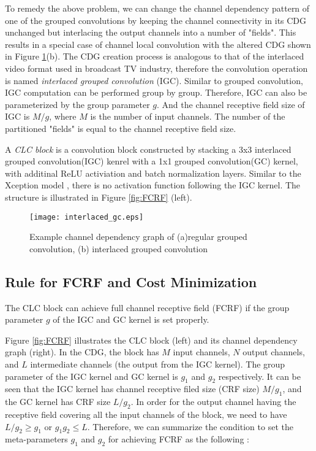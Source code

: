 \documentclass[10pt,twocolumn,letterpaper]{article}
\begin{document}
To remedy the above problem, we can change the channel dependency pattern of one of the grouped convolutions by keeping the channel connectivity in its CDG unchanged but interlacing the output channels into a number of "fields". This results in a special case of channel local convolution with the altered CDG shown in Figure \ref{fig:igc}(b). The CDG creation process is analogous to that of the interlaced video format used in broadcast TV industry, therefore the convolution operation is named \textit{interlaced grouped convolution} (IGC). Similar to grouped convolution, IGC computation can be performed group by group. Therefore, IGC can also be parameterized by the group parameter $g$. And the channel receptive field size of IGC is $M/g$, where $M$ is the number of input channels. The number of the partitioned "fields" is equal to the channel receptive field size. 

A \textit{CLC block} is a convolution block constructed by stacking a 3x3 interlaced grouped convolution(IGC) kenrel with a 1x1 grouped convolution(GC) kernel, with additinal ReLU activiation and batch normalization layers. Similar to the Xception model \cite{xception2017chollet}, there is no activation function following the IGC kernel. The structure is illustrated in Figure \ref{fig:FCRF} (left).

\begin{figure}[b!]
\begin{center}
\texttt{[image: interlaced\_gc.eps]}
                   
\end{center}
   \caption{Example channel dependency graph of (a)regular grouped convolution, (b) interlaced grouped convolution}
\label{fig:igc}
\end{figure}

\subsection{Rule for FCRF and Cost Minimization}
The CLC block can achieve full channel receptive field (FCRF) if the group parameter $g$ of the  IGC and GC  kernel is set properly. 

Figure \ref{fig:FCRF} illustrates the CLC block (left) and its channel dependency graph (right). In the CDG, the block has $M$ input channels, $N$ output channels, and $L$ intermediate channels (the output from the IGC kernel). The group parameter of the IGC kernel and GC kernel is $g_1$ and $g_2$ respectively. It can be seen that the IGC kernel has channel receptive filed size (CRF size) $M/g_1$, and the GC kernel has CRF size $L/g_2$. In order for the output channel having the receptive field covering all the input channels of the block, we need to have $L/g_2\ge{g_1}$ or $g_1g_2\le{L}$. Therefore, we can summarize the condition to set the meta-parameters $g_1$ and $g_2$ for achieving FCRF as the following :
\end{document}

